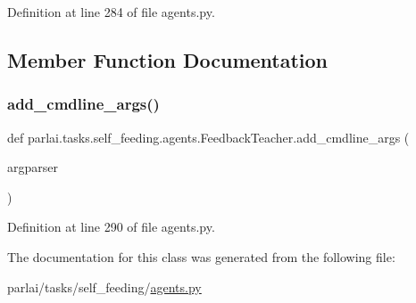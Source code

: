 Definition at line 284 of file agents.\+py.



\subsection{Member Function Documentation}
\mbox{\label{classparlai_1_1tasks_1_1self__feeding_1_1agents_1_1FeedbackTeacher_ad574b840424ec2d7096639c198af08c7}} 
\subsubsection{\texorpdfstring{add\+\_\+cmdline\+\_\+args()}{add\_cmdline\_args()}}
{\footnotesize\ttfamily def parlai.\+tasks.\+self\+\_\+feeding.\+agents.\+Feedback\+Teacher.\+add\+\_\+cmdline\+\_\+args (\begin{DoxyParamCaption}\item[{}]{argparser }\end{DoxyParamCaption})\hspace{0.3cm}{\ttfamily [static]}}



Definition at line 290 of file agents.\+py.



The documentation for this class was generated from the following file\+:\begin{DoxyCompactItemize}
\item 
parlai/tasks/self\+\_\+feeding/\hyperlink{parlai_2tasks_2self__feeding_2agents_8py}{agents.\+py}\end{DoxyCompactItemize}
